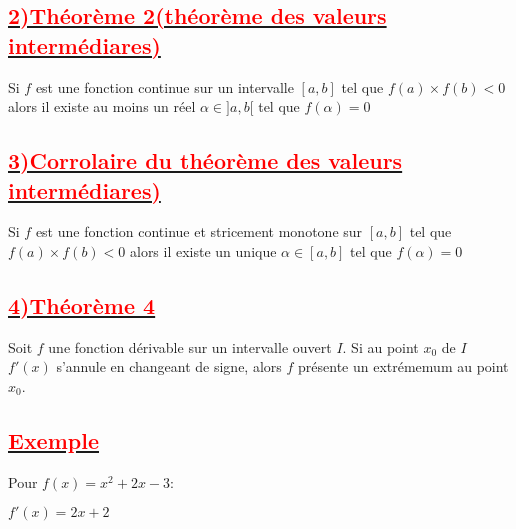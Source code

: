 \documentclass[12pt]{article}
\begin{document}
\subsection*{\underline{\textbf{\textcolor{red}{2)Théorème 2(théorème des valeurs intermédiares)}}}}
Si $f$ est une fonction continue sur un intervalle $[a, b]$ tel que $f(a)\times f(b)<0$ alors il existe au moins un réel $\alpha\in ]a, b[$ tel que $f(\alpha)=0$
\subsection*{\underline{\textbf{\textcolor{red}{3)Corrolaire du théorème des valeurs intermédiares)}}}}
Si $f$ est une fonction continue et stricement monotone sur $[a, b]$ tel que $f(a)\times f(b)<0$ alors il existe un unique $\alpha\in [a, b]$ tel que $f(\alpha)=0$
\subsection*{\underline{\textbf{\textcolor{red}{4)Théorème 4}}}}
Soit $f$ une fonction dérivable sur un intervalle ouvert $I$. Si au point $x_{0}$ de $I$ $f'(x)$ s'annule en changeant de signe, alors $f$ présente un extrémemum au point $x_{0}$.
\subsection*{\underline{\textbf{\textcolor{red}{Exemple}}}} 
Pour $f(x)=x^{2}+2x-3$:

$f'(x)=2x+2$
\end{document}
